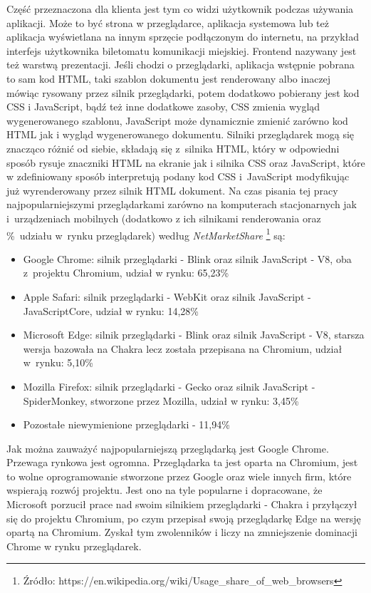 \documentclass[12pt,a4paper,oneside]{book}
\begin{document}
Część przeznaczona dla klienta jest tym co widzi użytkownik podczas używania aplikacji. Może to być strona w przeglądarce, aplikacja systemowa lub też aplikacja wyświetlana na innym sprzęcie podłączonym do internetu, na przykład interfejs użytkownika biletomatu komunikacji miejskiej. Frontend nazywany jest też warstwą prezentacji. Jeśli chodzi o przeglądarki, aplikacja wstępnie pobrana to sam kod HTML, taki szablon dokumentu jest renderowany albo inaczej mówiąc rysowany przez silnik przeglądarki, potem dodatkowo pobierany jest kod CSS i JavaScript, bądź też inne dodatkowe zasoby, CSS zmienia wygląd wygenerowanego szablonu, JavaScript może dynamicznie zmienić zarówno kod HTML jak i wygląd wygenerowanego dokumentu. Silniki przeglądarek mogą się znacząco różnić od siebie, składają się z~silnika HTML, który w odpowiedni sposób rysuje znaczniki HTML na ekranie jak i silnika CSS oraz JavaScript, które w zdefiniowany sposób interpretują podany kod CSS i~JavaScript modyfikując już wyrenderowany przez silnik HTML dokument.
Na czas pisania tej pracy najpopularniejszymi przeglądarkami zarówno na komputerach stacjonarnych jak i~urządzeniach mobilnych (dodatkowo z ich silnikami renderowania oraz \%~udziału w~rynku przeglądarek) według \textit{NetMarketShare} \footnote{Źródło: https://en.wikipedia.org/wiki/Usage\_share\_of\_web\_browsers} są:

\begin{itemize}
  \item Google Chrome: silnik przeglądarki - Blink oraz silnik JavaScript - V8, oba z~projektu Chromium, udział w rynku: 65,23\%
  \item Apple Safari: silnik przeglądarki - WebKit oraz silnik JavaScript - JavaScriptCore, udział w rynku: 14,28\%
  \item Microsoft Edge: silnik przeglądarki - Blink oraz silnik JavaScript - V8, starsza wersja bazowała na Chakra lecz została przepisana na Chromium, udział w~rynku: 5,10\% 
  \item Mozilla Firefox: silnik przeglądarki - Gecko oraz silnik JavaScript - SpiderMonkey, stworzone przez Mozilla, udział w rynku: 3,45\%
  \item Pozostałe niewymienione przeglądarki - 11,94\%
\end{itemize}

Jak można zauważyć najpopularniejszą przeglądarką jest Google Chrome. Przewaga rynkowa jest ogromna. Przeglądarka ta jest oparta na Chromium, jest to wolne oprogramowanie stworzone przez Google oraz wiele innych firm, które wspierają rozwój projektu. Jest ono na tyle popularne i dopracowane, że Microsoft porzucił prace nad swoim silnikiem przeglądarki - Chakra i przyłączył się do projektu Chromium, po czym przepisał swoją przeglądarkę Edge na wersję opartą na Chromium. Zyskał tym zwolenników i liczy na zmniejszenie dominacji Chrome w rynku przeglądarek.
\end{document}

